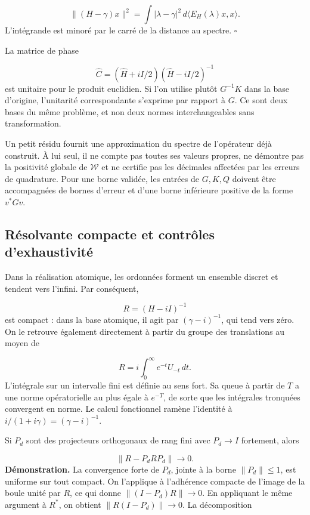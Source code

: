 \[
\|(H-\gamma)x\|^2
=\int |\lambda-\gamma|^2\,d\langle E_H(\lambda)x,x\rangle.
\]
L'intégrande est minoré par le carré de la distance au spectre. \hfill\(\square\)

La matrice de phase

\[
\widehat C=(\widehat H+iI/2)(\widehat H-iI/2)^{-1}
\]
est unitaire pour le produit euclidien. Si l'on utilise plutôt \(G^{-1}K\) dans la base d'origine, l'unitarité correspondante s'exprime par rapport à \(G\). Ce sont deux bases du même problème, et non deux normes interchangeables sans transformation.

Un petit résidu fournit une approximation du spectre de l'opérateur déjà construit. À lui seul, il ne compte pas toutes ses valeurs propres, ne démontre pas la positivité globale de \(\mathscr W\) et ne certifie pas les décimales affectées par les erreurs de quadrature. Pour une borne validée, les entrées de \(G,K,Q\) doivent être accompagnées de bornes d'erreur et d'une borne inférieure positive de la forme \(v^*Gv\).

\subsection{Résolvante compacte et contrôles d’exhaustivité}
\label{rz:resolvente}
Dans la réalisation atomique, les ordonnées forment un ensemble discret et tendent vers l’infini. Par conséquent,

\[
R=(H-iI)^{-1}
\]
est compact : dans la base atomique, il agit par \((\gamma-i)^{-1}\), qui tend vers zéro. On le retrouve également directement à partir du groupe des translations au moyen de

\[
R=i\int_0^\infty e^{-t}U_{-t}\,dt.
\]
L’intégrale sur un intervalle fini est définie au sens fort. Sa queue à partir de \(T\) a une norme opératorielle au plus égale à \(e^{-T}\), de sorte que les intégrales tronquées convergent en norme. Le calcul fonctionnel ramène l’identité à \(i/(1+i\gamma)=(\gamma-i)^{-1}\).

Si \(P_d\) sont des projecteurs orthogonaux de rang fini avec \(P_d\to I\) fortement, alors

\[
\|R-P_dRP_d\|\longrightarrow0.
\]
\textbf{Démonstration.} La convergence forte de \(P_d\), jointe à la borne \(\|P_d\|\leq1\), est uniforme sur tout compact. On l’applique à l’adhérence compacte de l’image de la boule unité par \(R\), ce qui donne \(\|(I-P_d)R\|\to0\). En appliquant le même argument à \(R^*\), on obtient \(\|R(I-P_d)\|\to0\). La décomposition

